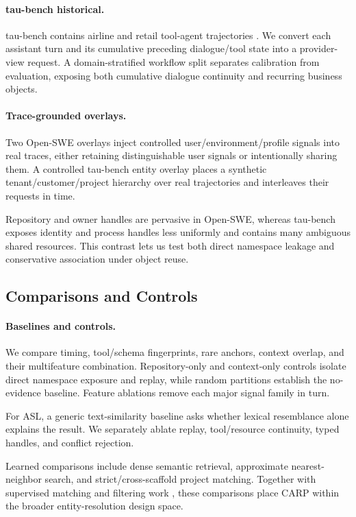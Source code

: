 \documentclass[letterpaper]{article} %
\newcommand{\asl}{\textsc{ASL}\xspace}
\begin{document}
\paragraph{tau-bench historical.}
tau-bench contains airline and retail tool-agent trajectories
\cite{yao2024taubench}. We convert each assistant turn and its cumulative preceding dialogue/tool
state into a provider-view request. A domain-stratified workflow split separates calibration from
evaluation, exposing both cumulative dialogue continuity and recurring business objects.

\paragraph{Trace-grounded overlays.}
Two Open-SWE overlays inject controlled user/environment/profile signals into real traces, either
retaining distinguishable user signals or intentionally sharing them. A controlled tau-bench entity
overlay places a synthetic tenant/customer/project hierarchy over
real trajectories and interleaves their requests in time.

Repository and owner handles are pervasive in Open-SWE, whereas tau-bench exposes identity and
process handles less uniformly and contains many ambiguous shared resources. This contrast lets us
test both direct namespace leakage and conservative association under object reuse.

\subsection{Comparisons and Controls}

\paragraph{Baselines and controls.}
We compare timing, tool/schema fingerprints, rare anchors, context overlap, and their multifeature
combination. Repository-only and context-only controls isolate direct namespace exposure and replay,
while random partitions establish the no-evidence baseline. Feature ablations remove each major
signal family in turn.

For \asl, a generic text-similarity baseline asks whether lexical resemblance alone explains the
result. We separately ablate replay, tool/resource continuity, typed handles, and conflict rejection.

Learned comparisons include dense semantic retrieval, approximate nearest-neighbor search, and
strict/cross-scaffold project matching. Together with supervised matching and filtering work
\cite{li2020ditto}, these comparisons place CARP within the broader entity-resolution design space.
\end{document}
